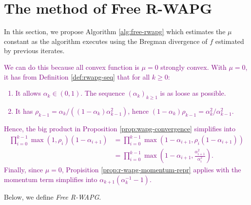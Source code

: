\documentclass[12pt]{article}
\begin{document}
\section{The method of Free R-WAPG}\label{sec:free-rwapg}
    In this section, we propose Algorithm \ref{alg:free-rwapg} which estimates the $\mu$ constant as the algorithm executes using the Bregman divergence of $f$ estimated by previous iterates.
    \par
    \textcolor{purple}{
        We can do this because all convex function is $\mu = 0$ strongly convex. 
        With $\mu = 0$, it has from Definition \ref{def:rwapg-seq} that for all $k \ge 0$: 
        \begin{enumerate}[nosep]
            \item It allows $\alpha_k \in (0, 1)$. The sequence $(\alpha_k)_{k \ge 1}$ is as loose as possible. 
            \item It has $\rho_{k - 1} = \alpha_k/((1 - \alpha_k)\alpha_{k - 1}^2)$, hence $(1 - \alpha_k)\rho_{k - 1} = \alpha_k^2/\alpha_{k - 1}^2$. 
        \end{enumerate}
        Hence, the big product in Proposition \ref{prop:wapg-convergence} simplifies into
        \begin{align*}
            \prod_{i = 0}^{k - 1}
            \max(1, \rho_i)(1 - \alpha_{i + 1})
            &= 
            \prod_{i = 0}^{k - 1}
            \max(1 - \alpha_{i + 1}, \rho_i(1 - \alpha_{i + 1}))
            \\
            &= 
            \prod_{i = 0}^{k - 1}
            \max\left(
                1 - \alpha_{i + 1}, \frac{\alpha_{i + 1}^2}{\alpha_i^2}\right). 
        \end{align*}
        Finally, since $\mu = 0$, Propisition \ref{prop:r-wapg-momentum-repr} applies with the momentum term simplifies into $\alpha_{k + 1}(\alpha_k^{-1} - 1)$. 
    }
    \par
    Below, we define \emph{Free R-WAPG}. 
\end{document}

